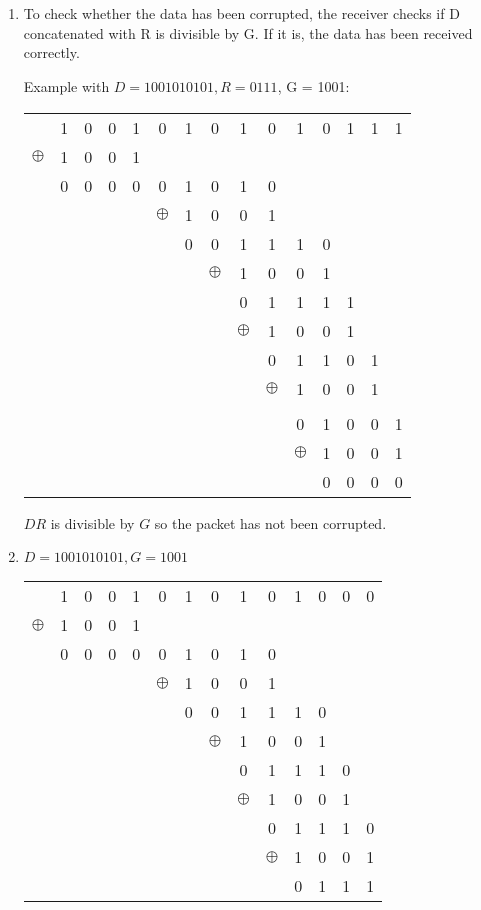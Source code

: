 \documentclass[12pt, a4paper]{article}
\begin{document}
\section{} %
\begin{enumerate}[a]
	\item %
	To check whether the data has been corrupted, the receiver checks if D concatenated with R is divisible by G. If it is, the data has been received correctly.

	Example with $D = 1001010101, R = 0111$, G = 1001:

	\begin{tabular}{ccccccccccccccc}
		& 1 & 0 & 0 & 1 & 0 & 1 & 0 & 1 & 0 & 1 & 0 & 1 & 1 & 1\\
		$\oplus$ & 1 & 0 & 0 & 1\\\cline{2-5}
		& 0 & 0 & 0 & 0 & 0 & 1 & 0 & 1 & 0\\
		&&&&& $\oplus$ & 1 & 0 & 0 & 1\\\cline{7-10}
		&&&&&& 0 & 0 & 1 & 1 & 1 & 0\\
		&&&&&&& $\oplus$ & 1 & 0 & 0 & 1\\\cline{9-12}
		&&&&&&&& 0 & 1 & 1 & 1 & 1\\
		&&&&&&&& $\oplus$ & 1 & 0 & 0 & 1\\\cline{10-13}
		&&&&&&&&& 0 & 1 & 1 & 0 & 1\\
		&&&&&&&&& $\oplus$ & 1 & 0 & 0 & 1\\\cline{11-14}
		&&&&&&&&&& \\
		&&&&&&&&&& 0 & 1 & 0 & 0 & 1\\
		&&&&&&&&&& $\oplus$ & 1 & 0 & 0 & 1\\\cline{12-15}
		&&&&&&&&&&& 0 & 0 & 0 & 0\\
	\end{tabular}

	$DR$ is divisible by $G$ so the packet has not been corrupted.
	\item %
	$D = 1001010101, G = 1001$

	\begin{tabular}{cccccccccccccc}
		& 1 & 0 & 0 & 1 & 0 & 1 & 0 & 1 & 0 & 1 & 0 & 0 & 0\\
		$\oplus$ & 1 & 0 & 0 & 1\\\cline{2-5}
		& 0 & 0 & 0 & 0 & 0 & 1 & 0 & 1 & 0\\
		&&&&& $\oplus$ & 1 & 0 & 0 & 1\\\cline{7-10}
		&&&&&& 0 & 0 & 1 & 1 & 1 & 0\\
		&&&&&&& $\oplus$ & 1 & 0 & 0 & 1\\\cline{9-12}
		&&&&&&&& 0 & 1 & 1 & 1 & 0\\
		&&&&&&&& $\oplus$ & 1 & 0 & 0 & 1\\\cline{10-13}
		&&&&&&&&& 0 & 1 & 1 & 1 & 0\\
		&&&&&&&&& $\oplus$ & 1 & 0 & 0 & 1\\\cline{11-14}
		&&&&&&&&&& 0 & 1 & 1 & 1\\
	\end{tabular}


\end{enumerate}
\end{document}
